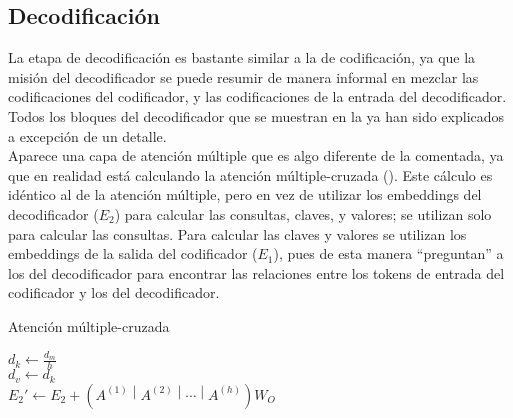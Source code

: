 			\subsection{Decodificación}
			
				La etapa de decodificación es bastante similar a la de codificación, ya que la misión del decodificador se puede resumir de manera informal en mezclar las codificaciones del codificador, y las codificaciones de la entrada del decodificador. Todos los bloques del decodificador que se muestran en la  ya han sido explicados a excepción de un detalle. \\
				
				Aparece una capa de atención múltiple que es algo diferente de la comentada, ya que en realidad está calculando la atención múltiple-cruzada (). Este cálculo es idéntico al de la atención múltiple, pero en vez de utilizar los embeddings del decodificador ($E_2$) para calcular las consultas, claves, y valores; se utilizan solo para calcular las consultas. Para calcular las claves y valores se utilizan los embeddings de la salida del codificador ($E_1$), pues de esta manera ``preguntan'' a los del decodificador para encontrar las relaciones entre los tokens de entrada del codificador y los del decodificador. 
				
				\begin{algorithm}
					\DontPrintSemicolon
					
					\caption{Atención múltiple-cruzada}
					\label{algo:attention_multiple-cruzada}
					
					$d_k \gets \frac{d_m}{h}$\\
					$d_v \gets d_k$\\
					$E_2' \gets E_2 + \left(A^{(1)}\middle|A^{(2)}\middle|\cdots\middle|A^{(h)}\right)W_O$
				\end{algorithm}
				

